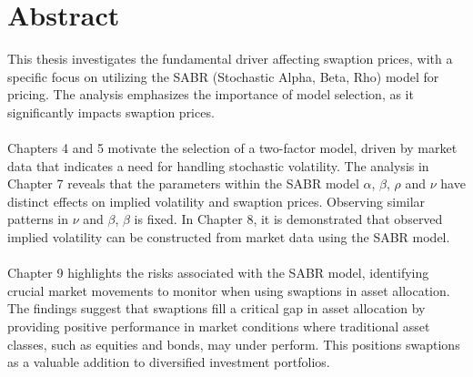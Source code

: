 \section*{Abstract}
This thesis investigates the fundamental driver affecting swaption prices, 
with a specific focus on utilizing the SABR (Stochastic Alpha, Beta, Rho) model for pricing.
The analysis emphasizes the importance of model selection, as it significantly impacts swaption prices.
\\\\
Chapters 4 and 5 motivate the selection of a two-factor model, driven by market data that indicates a
need for handling stochastic volatility. The analysis in Chapter 7 reveals that the parameters within the 
SABR model $\alpha$, $\beta$, $\rho$ and $\nu$ have distinct effects on implied volatility and swaption prices. 
Observing similar patterns in $\nu$ and $\beta$, $\beta$ is fixed.
In Chapter 8, it is demonstrated that observed implied volatility can be constructed from market data using 
the SABR model.
\\\\
Chapter 9 highlights the risks associated with the SABR model, identifying crucial market movements 
to monitor when using swaptions in asset allocation. The findings suggest that swaptions fill a critical 
gap in asset allocation by providing positive performance in market conditions where traditional asset classes, 
such as equities and bonds, may under perform. This positions swaptions as a valuable addition to diversified 
investment portfolios.

